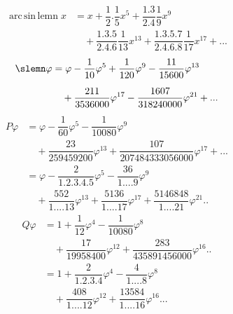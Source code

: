 \[
\begin{aligned}\operatorname{arc\,sin\,lemn}x&=x+\dfrac12.\dfrac15x^5+\dfrac{1.3}{2.4}\dfrac19x^9\\[6pt]&\quad{}+\dfrac{1.3.5}{2.4.6}\dfrac1{13}x^{13}+\dfrac{1.3.5.7}{2.4.6.8}\dfrac1{17}x^{17}+\mathord{.}\mathord{.}\mathord{.}\end{aligned}
\]
\[
\begin{aligned}\slemn\varphi&=\varphi-\dfrac1{10}\varphi^5+\dfrac1{120}\varphi^9-\dfrac{11}{15600}\varphi^{13}\\[6pt]&\quad{}+\dfrac{211}{3536000}\varphi^{17}-\dfrac{1607}{318240000}\varphi^{21}+\mathord{.}\mathord{.}\mathord{.}\end{aligned}
\]
\[
\begin{aligned}
P\varphi&=\varphi-\dfrac1{60}\varphi^5-\dfrac1{10080}\varphi^9\\[6pt]&\quad{}+\dfrac{23}{259459200}\varphi^{13}+\dfrac{107}{207484333056000}\varphi^{17}+\mathord{.}\mathord{.}\mathord{.}\\[12pt]
&=\varphi-\dfrac2{1.2.3.4.5}\varphi^5-\dfrac{36}{1\mathord{.}\mathord{.}\mathord{.}\mathord{.}9}\varphi^9\\[6pt]&\quad{}+\dfrac{552}{1\mathord{.}\mathord{.}\mathord{.}\mathord{.}13}\varphi^{13}+\dfrac{5136}{1\mathord{.}\mathord{.}\mathord{.}\mathord{.}17}\varphi^{17}+\dfrac{5146848}{1\mathord{.}\mathord{.}\mathord{.}\mathord{.}21}\varphi^{21}\mathord{.}\mathord{.}
\end{aligned}
\]
\[
\begin{aligned}
Q\varphi&=1+\dfrac1{12}\varphi^4-\dfrac1{10080}\varphi^8\\[6pt]&\quad{}+\dfrac{17}{19958400}\varphi^{12}+\dfrac{283}{435891456000}\varphi^{16}\mathord{.}\mathord{.}\\[12pt]
&=1+\dfrac2{1.2.3.4}\varphi^4-\dfrac4{1\mathord{.}\mathord{.}\mathord{.}\mathord{.}8}\varphi^8\\[6pt]&\quad{}+\dfrac{408}{1\mathord{.}\mathord{.}\mathord{.}\mathord{.}12}\varphi^{12}+\dfrac{13584}{1\mathord{.}\mathord{.}\mathord{.}\mathord{.}16}\varphi^{16}\mathord{.}\mathord{.}\mathord{.}
\end{aligned}
\]
